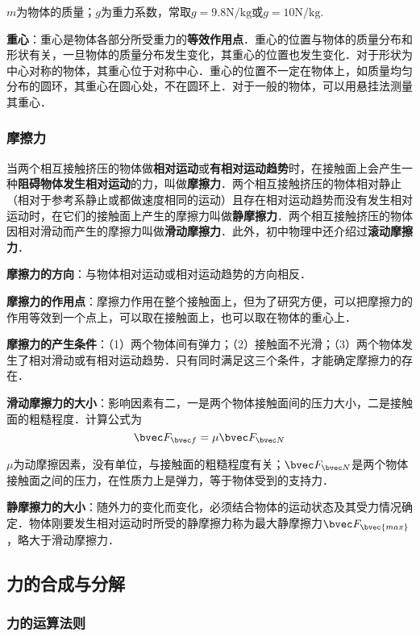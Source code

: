 $m$为物体的质量；$g$为重力系数，常取$g=9.8\mathrm{N/kg}$或$g=\mathrm{10N/kg}$.

\textbf{重心}：重心是物体各部分所受重力的\textbf{等效作用点}．重心的位置与物体的质量分布和形状有关，一旦物体的质量分布发生变化，其重心的位置也发生变化．对于形状为中心对称的物体，其重心位于对称中心．重心的位置不一定在物体上，如质量均匀分布的圆环，其重心在圆心处，不在圆环上．对于一般的物体，可以用悬挂法测量其重心．


\subsubsection{摩擦力}
当两个相互接触挤压的物体做\textbf{相对运动}或\textbf{有相对运动趋势}时，在接触面上会产生一种\textbf{阻碍物体发生相对运动}的力，叫做\textbf{摩擦力}．两个相互接触挤压的物体相对静止（相对于参考系静止或都做速度相同的运动）且存在相对运动趋势而没有发生相对运动时，在它们的接触面上产生的摩擦力叫做\textbf{静摩擦力}．两个相互接触挤压的物体因相对滑动而产生的摩擦力叫做\textbf{滑动摩擦力}．此外，初中物理中还介绍过\textbf{滚动摩擦力}．

\textbf{摩擦力的方向}：与物体相对运动或相对运动趋势的方向相反．

\textbf{摩擦力的作用点}：摩擦力作用在整个接触面上，但为了研究方便，可以把摩擦力的作用等效到一个点上，可以取在接触面上，也可以取在物体的重心上．

\textbf{摩擦力的产生条件}：（1）两个物体间有弹力；（2）接触面不光滑；（3）两个物体发生了相对滑动或有相对运动趋势．只有同时满足这三个条件，才能确定摩擦力的存在．

\textbf{滑动摩擦力的大小}：影响因素有二，一是两个物体接触面间的压力大小，二是接触面的粗糙程度．计算公式为
\begin{equation}
\bvec F_{\bvec f}=\mu \bvec F_{\bvec N}
\end{equation}

$\mu$为动摩擦因素，没有单位，与接触面的粗糙程度有关；$\bvec F_{\bvec N}$是两个物体接触面之间的压力，在性质力上是弹力，等于物体受到的支持力．

\textbf{静摩擦力的大小}：随外力的变化而变化，必须结合物体的运动状态及其受力情况确定．物体刚要发生相对运动时所受的静摩擦力称为最大静摩擦力$\bvec F_\bvec{max}$，略大于滑动摩擦力．

\subsection{力的合成与分解}
\subsubsection{力的运算法则}

